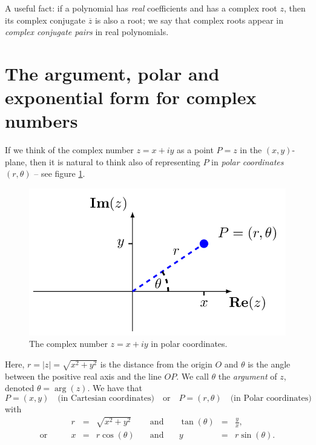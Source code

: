 \documentclass[
]{book}
\theoremstyle{definition}
\theoremstyle{definition}
\theoremstyle{definition}
\theoremstyle{definition}
\theoremstyle{remark}
\begin{document}
A useful fact: if a polynomial has \emph{real} coefficients and has a complex root \(z\), then its complex conjugate \(\overline{z}\) is also a root; we say that complex roots appear in \emph{complex conjugate pairs} in real polynomials.

\hypertarget{the-argument-polar-and-exponential-form-for-complex-numbers}{%
\section{The argument, polar and exponential form for complex numbers}\label{the-argument-polar-and-exponential-form-for-complex-numbers}}

If we think of the complex number \(z = x + iy\) as a point \(P = z\) in the \((x,y)\)-plane, then it is natural to think also of representing \(P\) in \emph{polar coordinates} \((r,\theta)\) -- see figure \ref{fig:complexpolar}.

\begin{figure}
\includegraphics{figures/complexpolar} \caption{The complex number $z = x + iy$ in polar coordinates.}\label{fig:complexpolar}
\end{figure}

Here, \(r = |z| = \sqrt{x^2 + y^2}\) is the distance from the origin \(O\) and \(\theta\) is the angle between the positive real axis and the line \(OP\). We call \(\theta\) the \emph{argument} of \(z\), denoted \(\theta = \arg(z)\). We have that
\[
P = (x,y) \quad \text{(in Cartesian coordinates)}\quad \text{or} \quad
P = (r,\theta) \quad \text{(in Polar coordinates)}
\]
with
\[\begin{array}{rrclcrcl}
& r &=& \sqrt{x^2 + y^2} & \quad\text{and}\quad & \tan(\theta) &=& \frac{y}{x},\\
\text{or} \qquad & x &=& r \cos(\theta) & \quad\text{and}\quad & y &=& r \sin(\theta).
\end{array}\]
\end{document}

